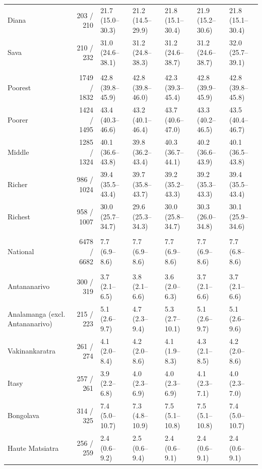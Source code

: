 \documentclass[11pt,a4paper]{article}
\begin{document}
\begin{landscape}
\begin{longtable}{l|rlllll}
Diana & 203 / 210 & 21.7 (15.0–30.3) & 21.2 (14.5–29.9) & 21.8 (15.1–30.4) & 21.9 (15.2–30.6) & 21.8 (15.1–30.4) \\ 
Sava & 210 / 232 & 31.0 (24.6–38.1) & 31.2 (24.8–38.3) & 31.2 (24.6–38.7) & 31.2 (24.6–38.7) & 32.0 (25.7–39.1) \\ 
\midrule\addlinespace[2.5pt]
\multicolumn{7}{l}{Stunting — Wealth quintile} \\[2.5pt] 
\midrule\addlinespace[2.5pt]
Poorest & 1749 / 1832 & 42.8 (39.8–45.9) & 42.8 (39.8–46.0) & 42.3 (39.3–45.4) & 42.8 (39.9–45.9) & 42.8 (39.8–45.8) \\ 
Poorer & 1424 / 1495 & 43.4 (40.3–46.6) & 43.2 (40.1–46.4) & 43.7 (40.6–47.0) & 43.3 (40.2–46.5) & 43.5 (40.4–46.7) \\ 
Middle & 1285 / 1324 & 40.1 (36.6–43.8) & 39.8 (36.2–43.4) & 40.3 (36.7–44.1) & 40.2 (36.6–43.9) & 40.1 (36.5–43.8) \\ 
Richer & 986 / 1024 & 39.4 (35.5–43.4) & 39.7 (35.8–43.7) & 39.2 (35.2–43.3) & 39.2 (35.3–43.3) & 39.4 (35.5–43.4) \\ 
Richest & 958 / 1007 & 30.0 (25.7–34.7) & 29.6 (25.3–34.3) & 30.0 (25.8–34.7) & 30.3 (26.0–34.8) & 30.1 (25.9–34.6) \\ 
\midrule\addlinespace[2.5pt]
\multicolumn{7}{l}{Wasting — National} \\[2.5pt] 
\midrule\addlinespace[2.5pt]
National & 6478 / 6682 & 7.7 (6.9–8.6) & 7.7 (6.9–8.6) & 7.7 (6.9–8.6) & 7.7 (6.9–8.6) & 7.7 (6.8–8.6) \\ 
\midrule\addlinespace[2.5pt]
\multicolumn{7}{l}{Wasting — Region} \\[2.5pt] 
\midrule\addlinespace[2.5pt]
Antananarivo & 300 / 319 & 3.7 (2.1–6.5) & 3.8 (2.1–6.6) & 3.6 (2.0–6.3) & 3.7 (2.1–6.6) & 3.7 (2.1–6.6) \\ 
Analamanga (excl. Antananarivo) & 215 / 223 & 5.1 (2.6–9.7) & 4.7 (2.3–9.4) & 5.3 (2.7–10.1) & 5.1 (2.6–9.7) & 5.1 (2.6–9.6) \\ 
Vakinankaratra & 261 / 274 & 4.1 (2.0–8.4) & 4.2 (2.0–8.6) & 4.1 (1.9–8.3) & 4.3 (2.1–8.5) & 4.2 (2.0–8.6) \\ 
Itasy & 257 / 261 & 3.9 (2.2–6.8) & 4.0 (2.3–6.9) & 4.0 (2.3–6.9) & 4.1 (2.3–7.1) & 4.0 (2.3–7.0) \\ 
Bongolava & 314 / 325 & 7.4 (5.0–10.7) & 7.3 (4.8–10.9) & 7.5 (5.1–10.8) & 7.5 (5.1–10.8) & 7.4 (5.0–10.7) \\ 
Haute Matsiatra & 256 / 259 & 2.4 (0.6–9.2) & 2.5 (0.6–9.4) & 2.4 (0.6–9.1) & 2.4 (0.6–9.1) & 2.4 (0.6–9.1) \\ 

\end{longtable}
\end{landscape}
\end{document}
